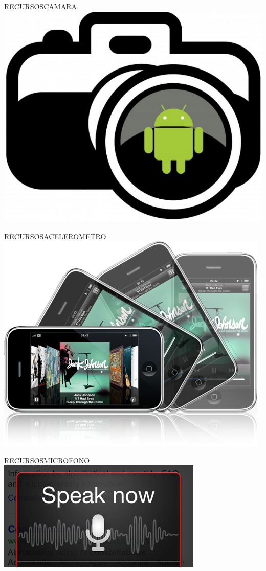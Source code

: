\documentclass{beamer}
\begin{document}
\begin{frame}{RECURSOS}{CAMARA}
\includegraphics[scale=0.5]{camara.jpeg}
\end{frame}

\begin{frame}{RECURSOS}{ACELEROMETRO}
   \includegraphics[scale=0.5]{acelerometro.png}
\end{frame}

\begin{frame}{RECURSOS}{MICROFONO}
\hspace{0.3in}\includegraphics[scale=0.5]{voice.jpg}
\end{frame}
\end{document}
